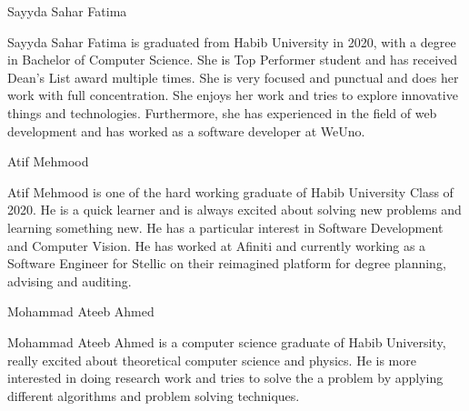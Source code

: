 
\begin{center}
    Sayyda Sahar Fatima
\end{center}
Sayyda Sahar Fatima is graduated from Habib University in 2020, with a degree in Bachelor of Computer Science. She is Top Performer student and has received Dean's List award multiple times. She is very focused and punctual and does her work with full concentration. She enjoys her work and tries to explore innovative things and technologies. Furthermore, she has experienced in the field of web development and has worked as a software developer at WeUno. 


\begin{center}
    Atif Mehmood
\end{center}
Atif Mehmood is one of the hard working graduate of Habib University Class of 2020. He is a quick learner and is always excited about solving new problems and learning something new. He has a particular interest in Software Development and Computer Vision. He has worked at Afiniti and currently working as a Software Engineer for Stellic on their reimagined platform for degree planning, advising and auditing. 

\begin{center}
    Mohammad Ateeb Ahmed
\end{center}
Mohammad Ateeb Ahmed is a computer science graduate of Habib University, really excited about theoretical computer science and physics. He is more interested in doing research work and tries to solve the a problem by applying different algorithms and problem solving techniques. 
